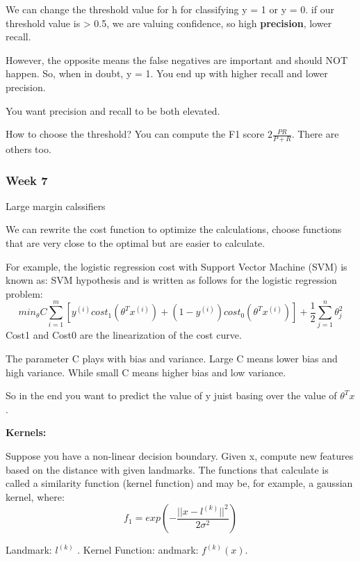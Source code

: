 \documentclass[12pt,a4paper]{report}
\begin{document}
	We can change the threshold value for h for classifying y = 1 or y = 0. if our threshold value is > 0.5, we are valuing confidence, so high \textbf{precision}, lower recall.
	
	However, the opposite means the false negatives are important and should NOT happen. So, when in doubt, y = 1. You end up with higher recall and lower precision.
	
	You want precision and recall to be both elevated.
	
	How to choose the threshold? You can compute the F1 score $2\frac{PR}{P+R}$. There are others too.
	
	\subsubsection{Week 7}

	Large margin calssifiers

	We can rewrite the cost function to optimize the calculations, choose functions that are very close to the optimal but are easier to calculate.
	
	For example, the logistic regression cost with Support Vector  Machine (SVM) is known as: SVM hypothesis and is written as follows for the logistic regression problem: 
	\begin{equation}
	min_{\theta} C \sum_{i=1}^{m} [y^{(i)}cost_1(\theta^Tx^{(i)}) + (1- y^{(i)})cost_0(\theta^Tx^{(i)})] + \frac{1}{2}\sum_{j=1}^{n}\theta_j^2
	\end{equation}
	Cost1 and Cost0 are  the linearization of the cost curve.
	
	The parameter C plays with bias and variance. Large C means lower bias and high variance. While small C means higher bias and low variance.	
	
	So in the end you want to predict the value of y juist basing over the value of $\theta^Tx$.	
	
	\textbf{Kernels: }
			
	Suppose you have a non-linear decision boundary. Given x, compute new features based on the distance with given landmarks. The functions that calculate is called a similarity function (kernel function) and may be, for example, a gaussian kernel, where:
	\begin{equation}
	f_1=exp(-\frac{||x-l^{(k)}||^2}{2\sigma^2})
	\end{equation}
	
	Landmark: $l^{(k)}$	. Kernel Function: andmark: $f^{(k)}(x)$.	
	
\end{document}
